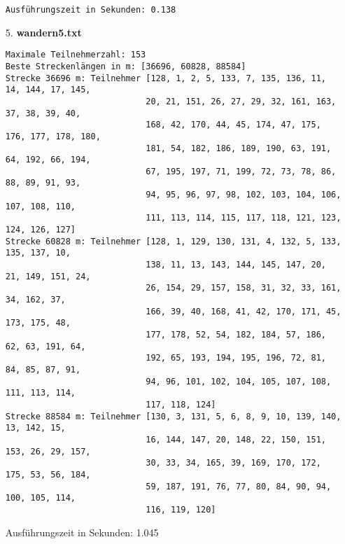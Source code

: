 \documentclass[a4paper,10pt,ngerman]{scrartcl}
\begin{document}
\begin{itemize}
\begin{verbatim}
Ausführungszeit in Sekunden: 0.138
  \end{verbatim}
  \item [5.] \textbf{wandern5.txt}
  \begin{verbatim}
Maximale Teilnehmerzahl: 153
Beste Streckenlängen in m: [36696, 60828, 88584]
Strecke 36696 m: Teilnehmer [128, 1, 2, 5, 133, 7, 135, 136, 11, 14, 144, 17, 145, 
                            20, 21, 151, 26, 27, 29, 32, 161, 163, 37, 38, 39, 40,
                            168, 42, 170, 44, 45, 174, 47, 175, 176, 177, 178, 180, 
                            181, 54, 182, 186, 189, 190, 63, 191, 64, 192, 66, 194, 
                            67, 195, 197, 71, 199, 72, 73, 78, 86, 88, 89, 91, 93, 
                            94, 95, 96, 97, 98, 102, 103, 104, 106, 107, 108, 110, 
                            111, 113, 114, 115, 117, 118, 121, 123, 124, 126, 127]
Strecke 60828 m: Teilnehmer [128, 1, 129, 130, 131, 4, 132, 5, 133, 135, 137, 10, 
                            138, 11, 13, 143, 144, 145, 147, 20, 21, 149, 151, 24, 
                            26, 154, 29, 157, 158, 31, 32, 33, 161, 34, 162, 37, 
                            166, 39, 40, 168, 41, 42, 170, 171, 45, 173, 175, 48, 
                            177, 178, 52, 54, 182, 184, 57, 186, 62, 63, 191, 64, 
                            192, 65, 193, 194, 195, 196, 72, 81, 84, 85, 87, 91, 
                            94, 96, 101, 102, 104, 105, 107, 108, 111, 113, 114, 
                            117, 118, 124]
Strecke 88584 m: Teilnehmer [130, 3, 131, 5, 6, 8, 9, 10, 139, 140, 13, 142, 15, 
                            16, 144, 147, 20, 148, 22, 150, 151, 153, 26, 29, 157, 
                            30, 33, 34, 165, 39, 169, 170, 172, 175, 53, 56, 184, 
                            59, 187, 191, 76, 77, 80, 84, 90, 94, 100, 105, 114, 
                            116, 119, 120]
  \end{verbatim}
Ausführungszeit in Sekunden: 1.045
\newline


\end{itemize}
\end{document}
